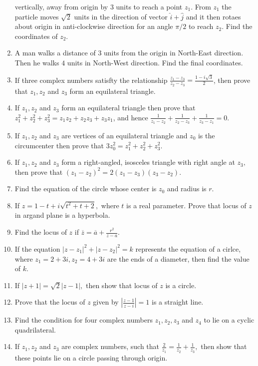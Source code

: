 \begin{enumerate}[resume]
  vertically, away from origin by $3$ units to reach a point $z_1$. From $z_1$ the particle moves $\sqrt{2}$ units in the
  direction of vector $\hat{i} + \hat{j}$ and it then rotaes about origin in anti-clockwise direction for an angle $\pi/2$
  to reach $z_2.$ Find the coordinates of $z_2$.
\item A man walks a distance of $3$ units from the origin in North-East direction. Then he walks $4$ units in North-West
  direction. Find the final coordinates.
\item If three complex numbers satisfty the relationship $\frac{z_1 - z_3}{z_2 - z_3} = \frac{1 - i\sqrt{3}}{2}$, then
  prove that $z_1, z_2$ and $z_3$ form an equilateral triangle.
\item If $z_1, z_2$ and $z_3$ form an equilateral triangle then prove that $z_1^2 + z_2^2 + z_3^2 = z_1z_2 + z_2z_3
  +z_3z_1$, and hence $\frac{1}{z_1 - z_2} + \frac{1}{z_2 - z_3} + \frac{1}{z_3 - z_1} = 0$.
\item If $z_1, z_2$ and $z_3$ are vertices of an equilateral triangle and $z_0$ is the circumcenter then prove that
  $3z_0^2 = z_1^2 + z_2^2 + z_3^2.$
\item If $z_1, z_2$ and $z_3$ form a right-angled, isosceles triangle with right angle at $z_3,$ then prove that $(z_1 -
  z_2)^2 = 2(z_1 - z_3)(z_3 - z_2)$.
\item Find the equation of the circle whose center is $z_0$ and radius is $r$.
\item If $z = 1 - t + i\sqrt{t^2 + t + 2},$ where $t$ is a real parameter. Prove that locus of $z$ in argand plane is a
  hyperbola.
\item Find the locus of $z$ if $\overline{z} = \overline{a} + \frac{r^2}{z - a}$.
\item If the equation $|z - z_1|^2 + |z - z_2|^2 = k$ represents the equation of a cirlce, where $z_1 = 2 + 3i, z_2 = 4 +
  3i$ are the ends of a diameter, then find the value of $k$.
\item If $|z + 1| = \sqrt{2}|z - 1|,$ then show that locus of $z$ is a circle.
\item Prove that the locus of $z$ given by $\left|\frac{z - 1}{z - i}\right| = 1$ is a straight line.
\item Find the condition for four complex numbers $z_1, z_2, z_3$ and $z_4$ to lie on a cyclic quadrilateral.
\item If $z_1, z_2$ and $z_3$ are complex numbers, such that $\frac{2}{z_1} = \frac{1}{z_2} + \frac{1}{z_3},$ then show
  that these points lie on a circle passing through origin.

\end{enumerate}
